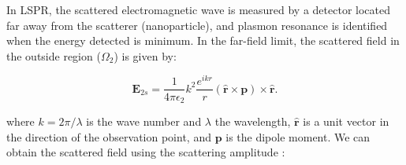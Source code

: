 In LSPR, the scattered electromagnetic wave is measured by a detector located far away 
from the scatterer (nanoparticle), and plasmon resonance is identified when the energy 
detected is minimum. In the far-field limit, the scattered field
in the outside region ($\Omega_2$) is given by: 

\begin{equation} \label{eq:scat_efield_long_range}
    \mathbf{E}_{2s} = \frac{1}{4\pi\epsilon_2}k^2\frac{e^{ikr}}{r} (\mathbf{\hat{r}} \times \mathbf{p})\times\mathbf{\hat{r}}.
\end{equation} 

\noindent where $k=2\pi/\lambda$ is the wave number and $\lambda$ the wavelength, $\mathbf{\hat{r}}$ 
is a unit vector in the direction of the observation point, and $\mathbf{p}$ is
the dipole moment.
We can obtain the scattered field using the 
scattering amplitude \cite{Jackson}:






